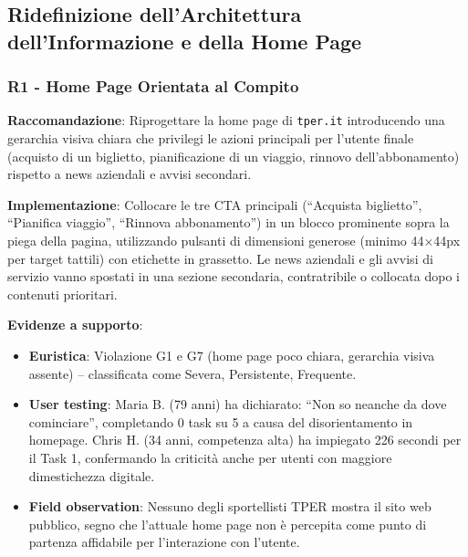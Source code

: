 \documentclass[11pt,a4paper]{article}
\begin{document}

\subsection{Ridefinizione dell'Architettura dell'Informazione e della Home Page}

\subsubsection{R1 - Home Page Orientata al Compito}
\label{rec:R1}

\textbf{Raccomandazione}: Riprogettare la home page di \texttt{tper.it}
introducendo una gerarchia visiva chiara che privilegi le azioni principali
per l'utente finale (acquisto di un biglietto, pianificazione di un viaggio,
rinnovo dell'abbonamento) rispetto a news aziendali e avvisi secondari.

\textbf{Implementazione}: Collocare le tre CTA principali (“Acquista
biglietto”, “Pianifica viaggio”, “Rinnova abbonamento”) in un blocco
prominente sopra la piega della pagina, utilizzando pulsanti di dimensioni
generose (minimo 44×44px per target tattili) con etichette in grassetto.
Le news aziendali e gli avvisi di servizio vanno spostati in una sezione
secondaria, contratribile o collocata dopo i contenuti prioritari.

\textbf{Evidenze a supporto}:
\begin{itemize}
    \item \textbf{Euristica}: Violazione G1 e G7 (home page poco chiara,
    gerarchia visiva assente) -- classificata come Severa, Persistente,
    Frequente.
    \item \textbf{User testing}: Maria B. (79 anni) ha dichiarato: “Non so
    neanche da dove cominciare”, completando 0 task su 5 a causa del
    disorientamento in homepage. Chris H. (34 anni, competenza alta) ha
    impiegato 226 secondi per il Task 1, confermando la criticit\`a anche
    per utenti con maggiore dimestichezza digitale.
    \item \textbf{Field observation}: Nessuno degli sportellisti TPER mostra
    il sito web pubblico, segno che l’attuale home page non \`e percepita come
    punto di partenza affidabile per l’interazione con l’utente.
\end{itemize}
\end{document}
